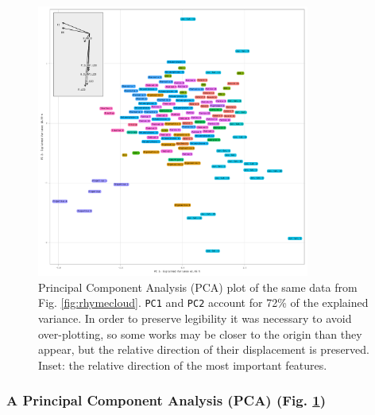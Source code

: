 \documentclass[twocolumn, switch]{article} %
\begin{document}
\begin{figure}[ht]
    \caption{
    Principal Component Analysis (PCA) plot of the same data from Fig.
    \ref{fig:rhymecloud}. \texttt{PC1} and \texttt{PC2} account for 72\% of
    the explained variance. In order to preserve legibility it was necessary
    to avoid over-plotting, so some works may be closer to the origin than
    they appear, but the relative direction of their displacement is
    preserved. Inset: the relative direction of the most important features.
    }
    \label{fig:rhymepca}
    \centering
    \includegraphics[width=0.8\textwidth]{rhyme_pca_arrows.pdf}
\end{figure}

\subsubsection{A Principal Component Analysis (PCA) (Fig. \ref{fig:rhymepca})}
\end{document}
